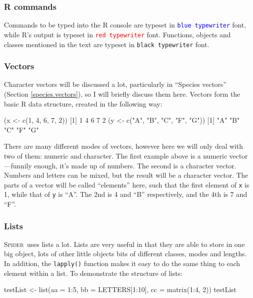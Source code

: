 \documentclass{article}
\newcommand{\Spider}{\textsc{Spider}} %
\newcommand{\progname}[1]{\textsc{#1}}
\newcommand{\fun}[1]{\texttt{#1}}
\begin{document}
\subsubsection{R commands}
Commands to be typed into the \progname{R} console are typeset in \texttt{\textcolor{blue}{blue typewriter}} font, while  \progname{R}'s output is typeset in \texttt{\textcolor{red}{red typewriter}} font. Functions, objects and classes mentioned in the text are typeset in \texttt{black typewriter} font.

\subsubsection{Vectors}
Character vectors will be discussed a lot, particularly in ``Species vectors'' (Section \ref{species.vectors}), so I will briefly discuss them here. Vectors form the basic \progname{R} data structure, created in the following way:

\begin{Rio}
(x <- c(1, 4, 6, 7, 2))
[1] 1 4 6 7 2
(y <- c("A", "B", "C", "F", "G"))
[1] "A" "B" "C" "F" "G"
\end{Rio}

There are many different modes of vectors, however here we will only deal with two of them: numeric and character. The first example above is a numeric vector---funnily enough, it's made up of numbers. The second is a character vector. Numbers and letters can be mixed, but the result will be a character vector. The parts of a vector will be called ``elements'' here, such that the first element of \fun{x} is 1, while that of \fun{y} is ``A''. The 2nd is 4 and ``B'' respectively, and the 4th is 7 and ``F''.

\subsubsection{Lists}
\Spider~uses lists a lot. Lists are very useful in that they are able to store in one big object, lots of other little objects bits of different classes, modes and lengths. In addition, the \fun{lapply()} function makes it easy to do the same thing to each element within a list. To demonstrate the structure of lists:

\begin{console}
testList <- list(aa = 1:5, bb = LETTERS[1:10], cc = matrix(1:4, 2))
testList
\end{console}

\end{document}
